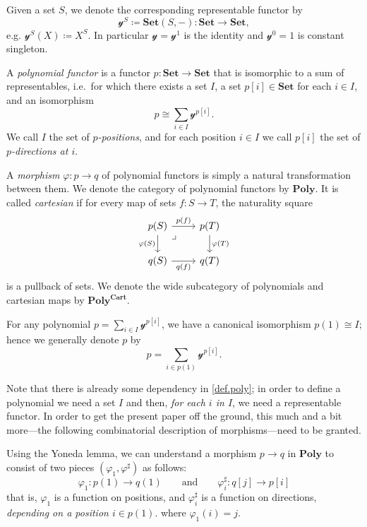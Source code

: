 \documentclass[11pt, one side, article]{memoir}
\theoremstyle{definition}
\theoremstyle{plain}
\newenvironment{remark}
  {\pushQED{\qed}\renewcommand{\qedsymbol}{$\lozenge$}\remarkx}
  {\popQED\endremarkx}
\newenvironment{definition}
  {\pushQED{\qed}\renewcommand{\qedsymbol}{$\lozenge$}\definitionx}
  {\popQED\enddefinitionx}
\newcommand{\Cat}[1]{\mathbf{#1}}%
\newcommand{\smset}{\Cat{Set}}
\newcommand{\yon}{\mathcal{y}}
\newcommand{\poly}{\Cat{Poly}}
\newcommand{\polycart}{\poly^{\Cat{Cart}}}
\newcommand{\0}{\textsf{0}}
\newcommand{\1}{\tn{\textsf{1}}}
\newcommand{\qqand}{\qquad\text{and}\qquad}
\begin{document}
\begin{definition}[Polynomial functor]\label{def.poly}
Given a set $S$, we denote the corresponding representable functor by
\[\yon^S\coloneqq\smset(S,-)\colon\smset\to\smset,\]
e.g. $\yon^S(X)\coloneqq X^S$. In particular $\yon=\yon^1$ is the identity and $\yon^0=1$ is constant singleton.

A \emph{polynomial functor} is a functor $p\colon\smset\to\smset$ that is isomorphic to a sum of representables, i.e.\ for which there exists a set $I$, a set $p[i]\in\smset$ for each $i\in I$, and an isomorphism
\[
p\cong\sum_{i\in I}\yon^{p[i]}.
\]
We call $I$ the set of \emph{$p$-positions}, and for each position $i\in I$ we call $p[i]$ the set of \emph{$p$-directions at $i$}. 

A \emph{morphism} $\varphi\colon p\to q$ of polynomial functors is simply a natural transformation between them. We denote the category of polynomial functors by $\poly$. It is called \emph{cartesian} if for every map of sets $f\colon S\to T$, the naturality square
\[
\begin{tikzcd}
  p(S)\ar[r, "p(f)"]\ar[d, "\varphi(S)"']&p(T)\ar[d, "\varphi(T)"]\\
  q(S)\ar[r, "q(f)"']&q(T)\ar[ul, phantom, very near end, "\lrcorner"]
\end{tikzcd}
\]
is a pullback of sets. We denote the wide subcategory of polynomials and cartesian maps by $\polycart$.
\end{definition}

For any polynomial $p=\sum_{i\in I}\yon^{p[i]}$, we have a canonical isomorphism $p(1)\cong I$; hence we generally denote $p$ by
\begin{equation}\label{eqn.poly_notation}
p=\sum_{i\in p(1)}\yon^{p[i]}.
\end{equation}

\begin{remark}
Note that there is already some dependency in \cref{def.poly}; in order to define a polynomial we need a set $I$ and then, \emph{for each $i$ in $I$}, we need a representable functor. In order to get the present paper off the ground, this much and a bit more---the following combinatorial description of morphisms---need to be granted.

Using the Yoneda lemma, we can understand a morphism $p\to q$ in $\poly$ to consist of two pieces $(\varphi_1,\varphi^\sharp)$ as follows:
\begin{equation}\label{eqn.mapsharp}
  \varphi_1\colon p(1)\to q(1)
  \qqand
  \varphi^\sharp_i\colon q[j]\to p[i]
\end{equation}
that is, $\varphi_1$ is a function on positions, and $\varphi^\sharp_i$ is a function on directions, \emph{depending on a position $i\in p(1)$}.
where $\varphi_1(i)=j$.
\end{remark}
\end{document}
